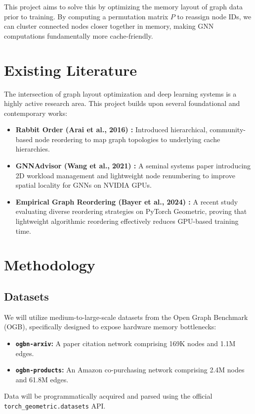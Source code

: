 \documentclass[sigconf,review]{acmart}
\begin{document}
This project aims to solve this by optimizing the memory layout of graph data prior to training. By computing a permutation matrix $P$ to reassign node IDs, we can cluster connected nodes closer together in memory, making GNN computations fundamentally more cache-friendly.

\section{Existing Literature}
The intersection of graph layout optimization and deep learning systems is a highly active research area. This project builds upon several foundational and contemporary works:

\begin{itemize}
    \item \textbf{Rabbit Order (Arai et al., 2016) \cite{arai2016rabbit}:} Introduced hierarchical, community-based node reordering to map graph topologies to underlying cache hierarchies.
    \item \textbf{GNNAdvisor (Wang et al., 2021) \cite{wang2021gnnadvisor}:} A seminal systems paper introducing 2D workload management and lightweight node renumbering to improve spatial locality for GNNs on NVIDIA GPUs.
    \item \textbf{Empirical Graph Reordering (Bayer et al., 2024) \cite{bayer2024reordering}:} A recent study evaluating diverse reordering strategies on PyTorch Geometric, proving that lightweight algorithmic reordering effectively reduces GPU-based training time.
\end{itemize}

\section{Methodology}

\subsection{Datasets}
We will utilize medium-to-large-scale datasets from the Open Graph Benchmark (OGB), specifically designed to expose hardware memory bottlenecks:
\begin{itemize}
    \item \textbf{\texttt{ogbn-arxiv}:} A paper citation network comprising 169K nodes and 1.1M edges.
    \item \textbf{\texttt{ogbn-products}:} An Amazon co-purchasing network comprising 2.4M nodes and 61.8M edges.
\end{itemize}
Data will be programmatically acquired and parsed using the official \texttt{torch\_geometric.datasets} API.
\end{document}
